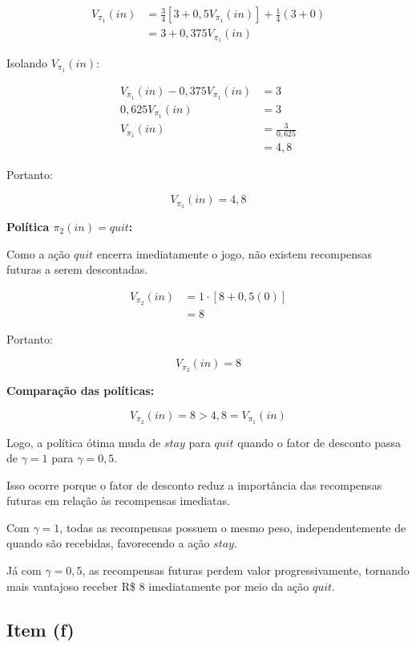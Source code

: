 \[
\begin{aligned}
    V_{\pi_1}(in)
    &= \frac{3}{4}
    \left[3 + 0{,}5V_{\pi_1}(in)\right]
    + \frac{1}{4}(3 + 0)
    \\[6pt]
    &= 3 + 0{,}375V_{\pi_1}(in)
\end{aligned}
\]

Isolando $V_{\pi_1}(in)$:

\[
\begin{aligned}
    V_{\pi_1}(in) - 0{,}375V_{\pi_1}(in) &= 3
    \\[6pt]
    0{,}625V_{\pi_1}(in) &= 3
    \\[6pt]
    V_{\pi_1}(in) &= \frac{3}{0{,}625}
    \\[6pt]
    &= 4{,}8
\end{aligned}
\]

Portanto:

\[
    \boxed{V_{\pi_1}(in) = 4{,}8}
\]

\textbf{Política $\pi_2(in) = quit$:}

Como a ação $quit$ encerra imediatamente o jogo,
não existem recompensas futuras a serem descontadas.

\[
\begin{aligned}
    V_{\pi_2}(in)
    &= 1 \cdot \left[8 + 0{,}5(0)\right]
    \\[6pt]
    &= 8
\end{aligned}
\]

Portanto:

\[
    \boxed{V_{\pi_2}(in) = 8}
\]

\textbf{Comparação das políticas:}

\[
    V_{\pi_2}(in) = 8 > 4{,}8 = V_{\pi_1}(in)
\]

Logo, a política ótima muda de $stay$ para $quit$
quando o fator de desconto passa de $\gamma = 1$
para $\gamma = 0{,}5$.

Isso ocorre porque o fator de desconto reduz
a importância das recompensas futuras em relação
às recompensas imediatas.

Com $\gamma = 1$, todas as recompensas possuem
o mesmo peso, independentemente de quando são
recebidas, favorecendo a ação $stay$.

Já com $\gamma = 0{,}5$, as recompensas futuras
perdem valor progressivamente, tornando mais
vantajoso receber R\$ 8 imediatamente por meio
da ação $quit$.


\subsection{Item (f)}

